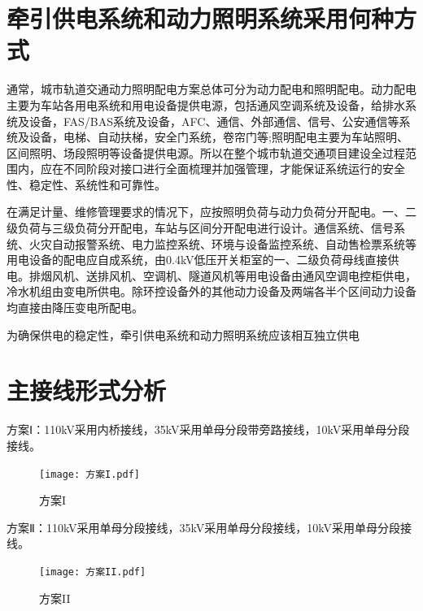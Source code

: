 \section{牵引供电系统和动力照明系统采用何种方式}
通常，城市轨道交通动力照明配电方案总体可分为动力配电和照明配电。动力配电主要为车站各用电系统和用电设备提供电源，包括通风空调系统及设备，给排水系统及设备，FAS/BAS系统及设备，AFC、通信、外部通信、信号、公安通信等系统及设备，电梯、自动扶梯，安全门系统，卷帘门等;照明配电主要为车站照明、区间照明、场段照明等设备提供电源。所以在整个城市轨道交通项目建设全过程范围内，应在不同阶段对接口进行全面梳理并加强管理，才能保证系统运行的安全性、稳定性、系统性和可靠性。\par 
在满足计量、维修管理要求的情况下，应按照明负荷与动力负荷分开配电。一、二级负荷与三级负荷分开配电，车站与区间分开配电进行设计。通信系统、信号系统、火灾自动报警系统、电力监控系统、环境与设备监控系统、自动售检票系统等用电设备的配电应自成系统，由0.4kV低压开关柜室的一、二级负荷母线直接供电。排烟风机、送排风机、空调机、隧道风机等用电设备由通风空调电控柜供电，冷水机组由变电所供电。除环控设备外的其他动力设备及两端各半个区间动力设备均直接由降压变电所配电。\par 
为确保供电的稳定性，牵引供电系统和动力照明系统应该相互独立供电
\section{主接线形式分析}
方案Ⅰ：110kV采用内桥接线，35kV采用单母分段带旁路接线，10kV采用单母分段接线。\par 
\begin{figure}[!h]
	\centering
	\texttt{[image: 方案I.pdf]}
	\caption{方案I}
	\label{方案I}
\end{figure}
方案Ⅱ：110kV采用单母分段接线，35kV采用单母分段接线，10kV采用单母分段接线。\par 

\begin{figure}[!h]
	\centering
	\texttt{[image: 方案II.pdf]}
	\caption{方案II}
	\label{方案II}
\end{figure}
